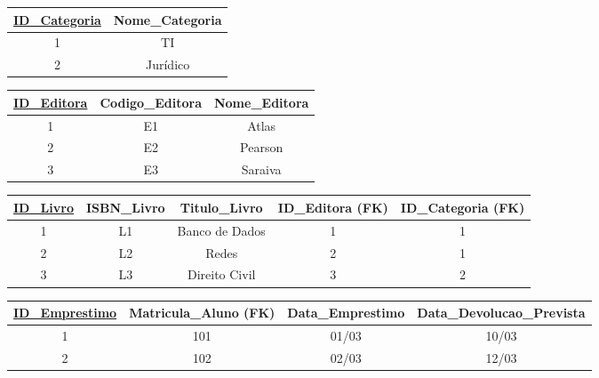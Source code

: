 \begin{adjustbox}{max width=\textwidth}
\begin{tabular}{|c|c|}
\hline
\textbf{\underline{ID\_Categoria}} & Nome\_Categoria \\ \hline
1 & TI \\ \hline
2 & Jurídico \\ \hline
\end{tabular}
\end{adjustbox}

\vspace{0.3cm}

\vspace{0.5cm}

\begin{adjustbox}{max width=\textwidth}
\begin{tabular}{|c|c|c|}
\hline
\textbf{\underline{ID\_Editora}} & Codigo\_Editora & Nome\_Editora \\ \hline
1 & E1 & Atlas \\ \hline
2 & E2 & Pearson \\ \hline
3 & E3 & Saraiva \\ \hline
\end{tabular}
\end{adjustbox}

\vspace{0.3cm}

\vspace{0.5cm}

\begin{adjustbox}{max width=\textwidth}
\begin{tabular}{|c|c|c|c|c|}
\hline
\textbf{\underline{ID\_Livro}} & ISBN\_Livro & Titulo\_Livro & ID\_Editora (FK) & ID\_Categoria (FK) \\ \hline
1 & L1 & Banco de Dados & 1 & 1 \\ \hline
2 & L2 & Redes & 2 & 1 \\ \hline
3 & L3 & Direito Civil & 3 & 2 \\ \hline
\end{tabular}
\end{adjustbox}

\vspace{0.3cm}

\vspace{0.5cm}

\begin{adjustbox}{max width=\textwidth}
\begin{tabular}{|c|c|c|c|}
\hline
\textbf{\underline{ID\_Emprestimo}} & Matricula\_Aluno (FK) & Data\_Emprestimo & Data\_Devolucao\_Prevista \\ \hline
1 & 101 & 01/03 & 10/03 \\ \hline
2 & 102 & 02/03 & 12/03 \\ \hline
\end{tabular}
\end{adjustbox}

